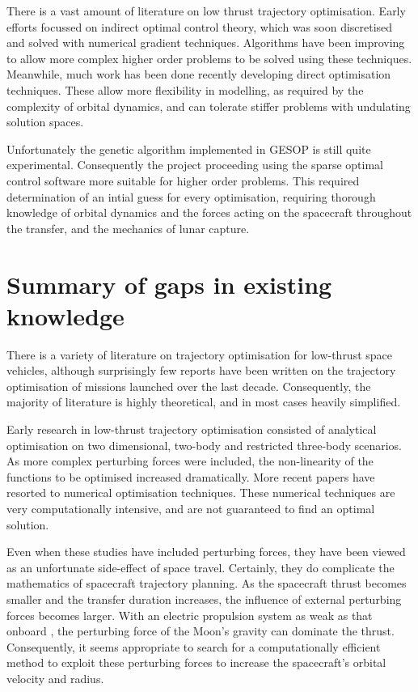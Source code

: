 There is a vast amount of literature on low thrust trajectory optimisation. Early efforts focussed on indirect optimal control theory, which was soon discretised and solved with numerical gradient techniques. Algorithms have been improving to allow more complex higher order problems to be solved using these techniques. Meanwhile, much work has been done recently developing direct optimisation techniques. These allow more flexibility in modelling, as required by the complexity of orbital dynamics, and can tolerate stiffer problems with undulating solution spaces. 

Unfortunately the genetic algorithm implemented in GESOP is still quite experimental. Consequently the project proceeding using the sparse optimal control software more suitable for higher order problems. This required determination of an intial guess for every optimisation, requiring thorough knowledge of orbital dynamics and the forces acting on the spacecraft throughout the transfer, and the mechanics of lunar capture.



\section{Summary of gaps in existing knowledge}

There is a variety of literature on trajectory optimisation for low-thrust space vehicles, although surprisingly few reports have been written on the trajectory optimisation of missions launched over the last decade. Consequently, the majority of literature is highly theoretical, and in most cases heavily simplified. 

Early research in low-thrust trajectory optimisation consisted of analytical optimisation on two dimensional, two-body and restricted three-body scenarios. As more complex perturbing forces were included, the non-linearity of the functions to be optimised increased dramatically. More recent papers have resorted to numerical optimisation techniques. These numerical techniques are very computationally intensive, and are not guaranteed to find an optimal solution.

Even when these studies have included perturbing forces, they have been viewed as an unfortunate side-effect of space travel. Certainly, they do complicate the mathematics of spacecraft trajectory planning. As the spacecraft thrust becomes smaller and the transfer duration increases, the influence of external perturbing forces becomes larger. With an electric propulsion system as weak as that onboard \BW, the perturbing force of the Moon's gravity can dominate the thrust. Consequently, it seems appropriate to search for a computationally efficient method to exploit these perturbing forces to increase the spacecraft's orbital velocity and radius.